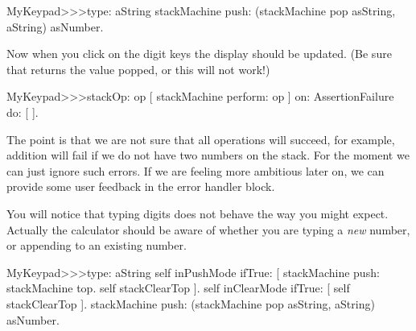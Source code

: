 \documentclass[a4paper,10pt,twoside]{book}
\begin{document}
\begin{code}{}
MyKeypad>>>type: aString
	stackMachine push: (stackMachine pop asString, aString) asNumber.
\end{code}
Now when you click on the digit keys the display should be updated.
(Be sure that  returns the value popped, or this will not work!)



\begin{code}{}
MyKeypad>>>stackOp: op
	[ stackMachine perform: op ] on: AssertionFailure do: [ ].
\end{code}

The point is that we are not sure that all operations will succeed, for example, addition will fail if we do not have two numbers on the stack.
For the moment we can just ignore such errors.
If we are feeling more ambitious later on, we can provide some user feedback in the error handler block.


You will notice that typing digits does not behave the way you might expect.
Actually the calculator should be aware of whether you are typing a \emph{new} number, or appending to an existing number.


\begin{code}{}
MyKeypad>>>type: aString
	self inPushMode ifTrue: [
		stackMachine push: stackMachine top.
		self stackClearTop ].
	self inClearMode ifTrue: [ self stackClearTop ].
	stackMachine push: (stackMachine pop asString, aString) asNumber.
\end{code}
\end{document}
